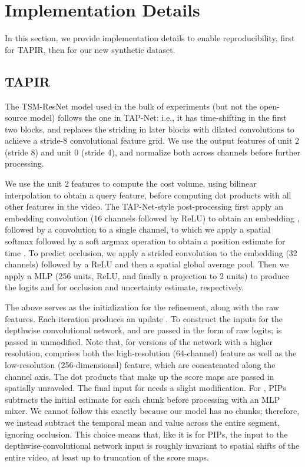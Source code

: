 \documentclass[10pt,twocolumn,letterpaper]{article}
\begin{document}
\section{Implementation Details}
\label{sec:impl}
In this section, we provide implementation details to enable reproducibility, first for TAPIR, then for our new synthetic dataset.

\subsection{TAPIR}
\label{sec:tapir_details}
The TSM-ResNet model used in the bulk of experiments (but not the open-source model) follows the one in TAP-Net: i.e., it has time-shifting in the first two blocks, and replaces the striding in later blocks with dilated convolutions to achieve a stride-8 convolutional feature grid.  We use the output features of unit 2 (stride 8) and unit 0 (stride 4), and normalize both across channels before further processing.

We use the unit 2 features to compute the cost volume, using bilinear interpolation to obtain a query feature, before computing dot products with all other features in the video.  The TAP-Net-style post-processing first apply an embedding convolution (16 channels followed by ReLU) to obtain an embedding , followed by a convolution to a single channel, to which we apply a spatial softmax followed by a soft argmax operation to obtain a position estimate  for time .  To predict occlusion, we apply a strided convolution to the embedding  (32 channels) followed by a ReLU and then a spatial global average pool.  Then we apply a MLP (256 units, ReLU, and finally a projection to 2 units) to produce the logits  and  for occlusion and uncertainty estimate, respectively. 

The above serves as the initialization for the refinement, along with the raw features.  Each iteration  produces an update .  To construct the inputs for the depthwise convolutional network,   and  are passed in the form of raw logits;  is passed in unmodified.  Note that, for versions of the network with a higher resolution,  comprises both the high-resolution (64-channel) feature as well as the low-resolution (256-dimensional) feature, which are concatenated along the channel axis.  The dot products that make up the score maps are passed in spatially unraveled.  The final input for  needs a slight modification.  For , PIPs subtracts the initial estimate for each chunk before processing with an MLP mixer.  We cannot follow this exactly because our model has no chunks; therefore, we instead subtract the temporal mean  and  value across the entire segment, ignoring occlusion.  This choice means that, like it is for PIPs, the input to the depthwise-convolutional network input is roughly invariant to spatial shifts of the entire video, at least up to truncation of the score maps.  
\end{document}
